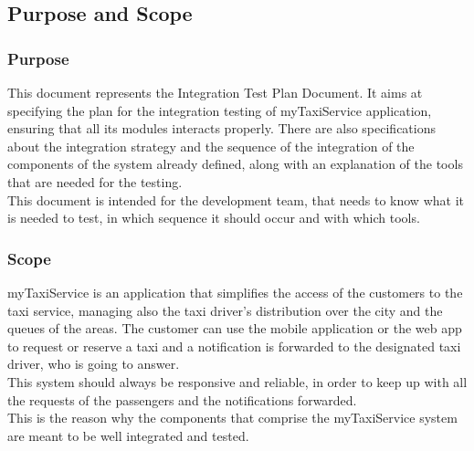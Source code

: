 \documentclass[18pt,oneside,a4paper, titlepage]{article}
\begin{document}
	\subsection{Purpose	and	Scope}
		\subsubsection{Purpose}
		This document represents the Integration Test Plan Document. It aims at specifying the plan for the integration testing of myTaxiService application, ensuring that all its modules interacts properly. There are also specifications about the integration strategy and the sequence of the integration of the components of the system already defined, along with an explanation of the tools that are needed for the testing.\\
		This document is intended for the development team, that needs to know what it is needed to test, in which sequence it should occur and with which tools.
		\subsubsection{Scope}
		myTaxiService is an application that simplifies the access of the customers to the taxi service, managing also the taxi driver's distribution over the city and the queues of the areas. The customer can use the mobile application or the web app to request or reserve a taxi and a notification is forwarded to the designated taxi driver, who is going to answer.\\ This system should always be responsive and reliable, in order to keep up with all the requests of the passengers and the notifications forwarded.\\ This is the reason why the components that comprise the myTaxiService system are meant to be well integrated and tested.
\end{document}
